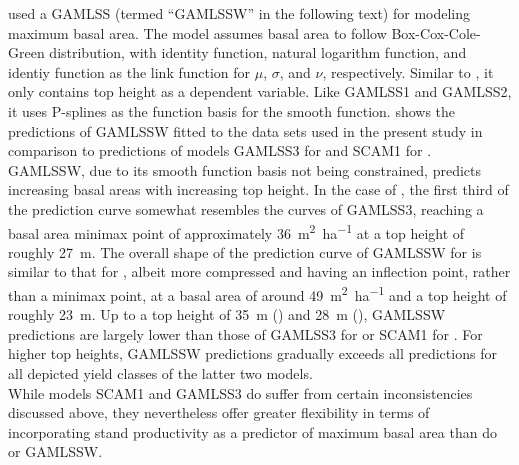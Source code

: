 \textcite{Woerdehoff2016} used a GAMLSS (termed ``GAMLSSW'' in the following text) for modeling maximum basal area.  The model assumes basal area to follow Box-Cox-Cole-Green distribution, with identity function, natural logarithm function, and identiy function as the link function for \(\mu\), \(\sigma\), and \(\nu\), respectively.  Similar to , it only contains top height as a dependent variable.  Like GAMLSS1 and GAMLSS2, it uses P-splines as the function basis for the smooth function.   shows the predictions of GAMLSSW fitted to the data sets used in the present study in comparison to predictions of models GAMLSS3 for \Beech{} and SCAM1 for \Spruce{}.  GAMLSSW, due to its smooth function basis not being constrained, predicts increasing basal areas with increasing top height.  In the case of \Beech{}, the first third of the prediction curve somewhat resembles the curves of GAMLSS3, reaching a basal area minimax point of approximately \SI{36}{\square\meter\per\hectare} at a top height of roughly \SI{27}{\meter}.  The overall shape of the  prediction curve of GAMLSSW for \Spruce{} is similar to that for \Beech{}, albeit more compressed and having an inflection point, rather than a minimax point, at a basal area of around \SI{49}{\square\meter\per\hectare} and a top height of roughly \SI{23}{\meter}.  Up to a top height of \SI{35}{\meter} (\Beech{}) and \SI{28}{\meter} (\Spruce{}), GAMLSSW predictions are largely lower than those of GAMLSS3 for \Beech{} or SCAM1 for \Spruce{}.  For higher top heights, GAMLSSW predictions gradually exceeds all predictions for all depicted yield classes of the latter two models.  \\
While models SCAM1 and GAMLSS3 do suffer from certain inconsistencies discussed above, they nevertheless offer greater flexibility in terms of incorporating stand productivity as a predictor of maximum basal area than do  or GAMLSSW.

